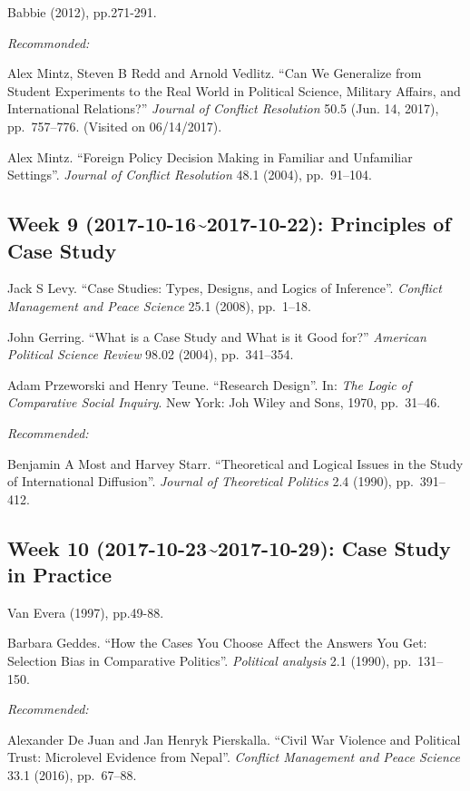 \documentclass[11pt,]{article}
\begin{document}
Babbie (2012), pp.271-291.

\emph{Recommonded:}

Alex Mintz, Steven B Redd and Arnold Vedlitz. ``Can We Generalize from
Student Experiments to the Real World in Political Science, Military
Affairs, and International Relations?''
\emph{Journal of Conflict Resolution} 50.5 (Jun. 14, 2017),
pp.~757--776. (Visited on 06/14/2017).

Alex Mintz. ``Foreign Policy Decision Making in Familiar and Unfamiliar
Settings''. \emph{Journal of Conflict Resolution} 48.1 (2004),
pp.~91--104.

\subsection{Week 9 (2017-10-16\textasciitilde{}2017-10-22): Principles
of Case
Study}\label{week-9-2017-10-162017-10-22-principles-of-case-study}

Jack S Levy. ``Case Studies: Types, Designs, and Logics of Inference''.
\emph{Conflict Management and Peace Science} 25.1 (2008), pp.~1--18.

John Gerring. ``What is a Case Study and What is it Good for?''
\emph{American Political Science Review} 98.02 (2004), pp.~341--354.

Adam Przeworski and Henry Teune. ``Research Design''. In:
\emph{The Logic of Comparative Social Inquiry}. New York: Joh Wiley and
Sons, 1970, pp.~31--46.

\emph{Recommended:}

Benjamin A Most and Harvey Starr. ``Theoretical and Logical Issues in
the Study of International Diffusion''.
\emph{Journal of Theoretical Politics} 2.4 (1990), pp.~391--412.

\subsection{Week 10 (2017-10-23\textasciitilde{}2017-10-29): Case Study
in Practice}\label{week-10-2017-10-232017-10-29-case-study-in-practice}

Van Evera (1997), pp.49-88.

Barbara Geddes. ``How the Cases You Choose Affect the Answers You Get:
Selection Bias in Comparative Politics''. \emph{Political analysis} 2.1
(1990), pp.~131--150.

\emph{Recommended:}

Alexander De Juan and Jan Henryk Pierskalla. ``Civil War Violence and
Political Trust: Microlevel Evidence from Nepal''.
\emph{Conflict Management and Peace Science} 33.1 (2016), pp.~67--88.
\end{document}
